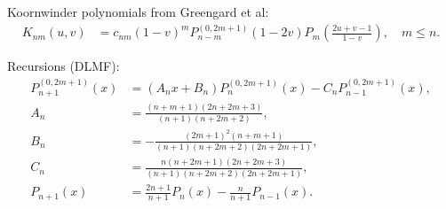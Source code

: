 \documentclass[a4paper,12pt]{article}
\begin{document}
Koornwinder polynomials from Greengard et al:
\begin{align}
  \label{equ:koornwinder:1}
  K_{nm}(u,v)
  &=
    c_{nm}(1-v)^{m}
    P_{n-m}^{(0,2m+1)}(1-2v)
    P_{m}
    \left(
    \frac{2u+v-1}{1-v}
    \right), \quad m\leq n.
\end{align}

Recursions (DLMF):
\begin{align}
  \label{equ:jacobi:1}
  P_{n+1}^{(0,2m+1)}(x)
  &=
    (A_{n}x + B_{n})P_{n}^{(0,2m+1)}(x) -
    C_{n}P_{n-1}^{(0,2m+1)}(x),\\
  A_{n} &= \frac{(n+m+1)(2n+2m+3)}{(n+1)(n+2m+2)},\\
  B_{n} &= -\frac{(2m+1)^{2}(n+m+1)}{(n+1)(n+2m+2)(2n+2m+1)},\\
  C_{n} &= \frac{n(n+2m+1)(2n+2m+3)}{(n+1)(n+2m+2)(2n+2m+1)},\\
  \label{equ:legendre}
  P_{n+1}(x)
  &=
    \frac{2n+1}{n+1}P_{n}(x) - \frac{n}{n+1}P_{n-1}(x).
\end{align}
\end{document}

